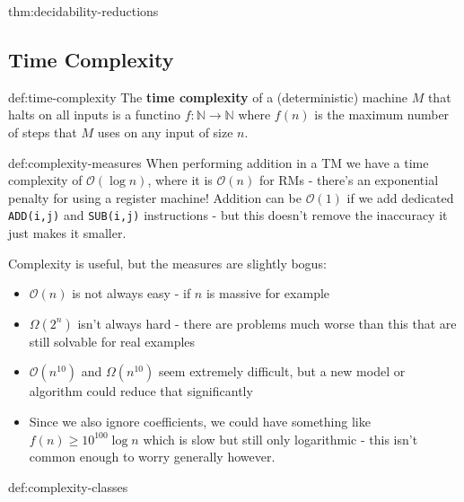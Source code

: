 \documentclass[landscape, 8pt]{extarticle}
\begin{document}
\begin{multicols}{3}
\begin{thm}{thm:decidability-reductions}{}
\end{thm}

\subsection*{Time Complexity}
\begin{dfn}{def:time-complexity}{}
The \textbf{time complexity} of a (deterministic) machine $M$ that halts on all inputs is a functino $f : \mathbb{N} \to \mathbb{N}$ where $f(n)$ is the maximum number of steps that $M$ uses on any input of size $n$.
\end{dfn}


\begin{dfn}{def:complexity-measures}{}
When performing addition in a TM we have a time complexity of $\mathcal{O}(\log n)$, where it is $\mathcal{O}(n)$ for RMs - there's an exponential penalty for using a register machine!
\newline
Addition can be $\mathcal{O}(1)$ if we add dedicated \texttt{ADD(i,j)} and \texttt{SUB(i,j)} instructions - but this doesn't remove the inaccuracy it just makes it smaller.

Complexity is useful, but the measures are slightly bogus:
\begin{itemize}
    \item $\mathcal{O}(n)$ is not always easy - if $n$ is massive for example
    \item $\Omega(2^n)$ isn't always hard - there are problems much worse than this that are still solvable for real examples
    \item $\mathcal{O}(n^{10})$ and $\Omega(n^{10})$ seem extremely difficult, but a new model or algorithm could reduce that significantly
    \item Since we also ignore coefficients, we could have something like $f(n) \geq 10^{100} \log n$ which is slow but still only logarithmic - this isn't common enough to worry generally however.
\end{itemize}
\end{dfn}


\begin{dfn}{def:complexity-classes}{}


\end{dfn}
\end{multicols}
\end{document}
